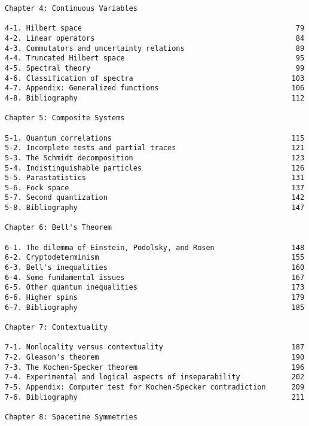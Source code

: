 \begin{verbatim}
Chapter 4: Continuous Variables 
 
4-1. Hilbert space                                                  79 
4-2. Linear operators                                               84 
4-3. Commutators and uncertainty relations                          89 
4-4. Truncated Hilbert space                                        95 
4-5. Spectral theory                                                99 
4-6. Classification of spectra                                     103 
4-7. Appendix: Generalized functions                               106 
4-8. Bibliography                                                  112
 
Chapter 5: Composite Systems  
 
5-1. Quantum correlations                                          115 
5-2. Incomplete tests and partial traces                           121 
5-3. The Schmidt decomposition                                     123 
5-4. Indistinguishable particles                                   126 
5-5. Parastatistics                                                131 
5-6. Fock space                                                    137 
5-7. Second quantization                                           142 
5-8. Bibliography                                                  147
 
Chapter 6: Bell's Theorem  
 
6-1. The dilemma of Einstein, Podolsky, and Rosen                  148 
6-2. Cryptodeterminism                                             155 
6-3. Bell's inequalities                                           160 
6-4. Some fundamental issues                                       167 
6-5. Other quantum inequalities                                    173 
6-6. Higher spins                                                  179 
6-7. Bibliography                                                  185
      
Chapter 7: Contextuality  
 
7-1. Nonlocality versus contextuality                              187 
7-2. Gleason's theorem                                             190 
7-3. The Kochen-Specker theorem                                    196 
7-4. Experimental and logical aspects of inseparability            202 
7-5. Appendix: Computer test for Kochen-Specker contradiction      209
7-6. Bibliography                                                  211

Chapter 8: Spacetime Symmetries  
 

\end{verbatim}
